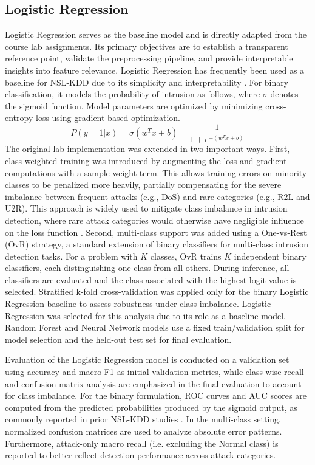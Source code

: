 \subsection{Logistic Regression}
Logistic Regression serves as the baseline model and is directly adapted from the course lab assignments. Its primary objectives are to establish a transparent reference point, 
validate the preprocessing pipeline, and provide interpretable insights into feature relevance. Logistic Regression has frequently been used as a baseline for NSL-KDD due to its 
simplicity and interpretability \cite{abrar2020machine, hegde2024intrusion}. For binary classification, it models the probability of intrusion as follows, where $\sigma$ denotes 
the sigmoid function. Model parameters are optimized by minimizing cross-entropy loss using gradient-based optimization.
\begin{equation}
    P(y=1|x) = \sigma(w^T x + b) = \frac{1}{1 + e^{-(w^T x + b)}}
\end{equation}
The original lab implementation was extended in two important ways. First, class-weighted training was introduced by augmenting the loss and gradient computations with a 
sample-weight term. This allows training errors on minority classes to be penalized more heavily, partially compensating for the severe imbalance between frequent attacks 
(e.g., DoS) and rare categories (e.g., R2L and U2R). This approach is widely used to mitigate class imbalance in intrusion detection, where rare attack categories would otherwise 
have negligible influence on the loss function \cite{abrar2020machine, hong2021machine}. Second, multi-class support was added using a One-vs-Rest (OvR) strategy, 
a standard extension of binary classifiers for multi-class intrusion detection tasks. For a problem with $K$ classes, OvR trains $K$ independent 
binary classifiers, each distinguishing one class from all others. During inference, all classifiers are evaluated and the class associated with the highest logit value is selected. Stratified k-fold cross-validation was applied only for the binary Logistic Regression baseline to assess robustness under class imbalance. Logistic Regression was selected for this analysis due to its role as a baseline model. Random Forest and Neural Network models use a fixed train/validation split for model selection and the held-out test set for final evaluation.

Evaluation of the Logistic Regression model is conducted on a validation set using accuracy and macro-F1 as initial validation metrics, while class-wise recall and confusion-matrix analysis are emphasized in the final evaluation to account for class imbalance. For the binary formulation, ROC curves and AUC scores are computed from the predicted probabilities produced by the sigmoid output, as commonly reported in prior NSL-KDD studies \cite{tavallaee2009detailed, ali2025deep}. In the multi-class setting, normalized confusion matrices are used to analyze absolute error patterns. Furthermore, attack-only macro recall (i.e. excluding the Normal class) is reported to better reflect detection performance across attack categories.
\pagebreak
